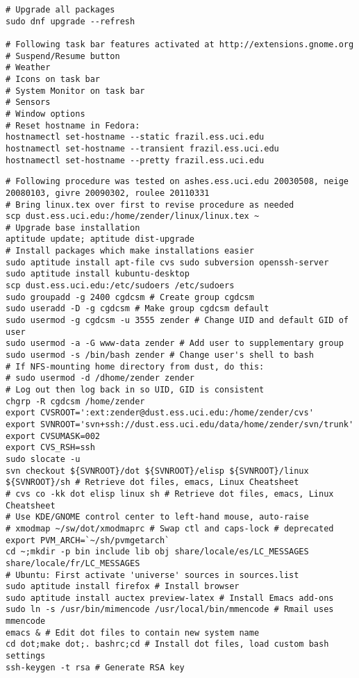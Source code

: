 \documentclass[12pt,twoside]{article}
\begin{document}
\begin{verbatim}
# Upgrade all packages
sudo dnf upgrade --refresh

# Following task bar features activated at http://extensions.gnome.org
# Suspend/Resume button
# Weather
# Icons on task bar
# System Monitor on task bar
# Sensors
# Window options
# Reset hostname in Fedora:
hostnamectl set-hostname --static frazil.ess.uci.edu
hostnamectl set-hostname --transient frazil.ess.uci.edu
hostnamectl set-hostname --pretty frazil.ess.uci.edu
\end{verbatim}
\begin{verbatim}
# Following procedure was tested on ashes.ess.uci.edu 20030508, neige 20080103, givre 20090302, roulee 20110331
# Bring linux.tex over first to revise procedure as needed
scp dust.ess.uci.edu:/home/zender/linux/linux.tex ~
# Upgrade base installation
aptitude update; aptitude dist-upgrade 
# Install packages which make installations easier
sudo aptitude install apt-file cvs sudo subversion openssh-server
sudo aptitude install kubuntu-desktop
scp dust.ess.uci.edu:/etc/sudoers /etc/sudoers
sudo groupadd -g 2400 cgdcsm # Create group cgdcsm
sudo useradd -D -g cgdcsm # Make group cgdcsm default
sudo usermod -g cgdcsm -u 3555 zender # Change UID and default GID of user
sudo usermod -a -G www-data zender # Add user to supplementary group
sudo usermod -s /bin/bash zender # Change user's shell to bash
# If NFS-mounting home directory from dust, do this:
# sudo usermod -d /dhome/zender zender 
# Log out then log back in so UID, GID is consistent
chgrp -R cgdcsm /home/zender
export CVSROOT=':ext:zender@dust.ess.uci.edu:/home/zender/cvs'
export SVNROOT='svn+ssh://dust.ess.uci.edu/data/home/zender/svn/trunk'
export CVSUMASK=002
export CVS_RSH=ssh
sudo slocate -u
svn checkout ${SVNROOT}/dot ${SVNROOT}/elisp ${SVNROOT}/linux ${SVNROOT}/sh # Retrieve dot files, emacs, Linux Cheatsheet
# cvs co -kk dot elisp linux sh # Retrieve dot files, emacs, Linux Cheatsheet
# Use KDE/GNOME control center to left-hand mouse, auto-raise 
# xmodmap ~/sw/dot/xmodmaprc # Swap ctl and caps-lock # deprecated
export PVM_ARCH=`~/sh/pvmgetarch`
cd ~;mkdir -p bin include lib obj share/locale/es/LC_MESSAGES share/locale/fr/LC_MESSAGES
# Ubuntu: First activate 'universe' sources in sources.list
sudo aptitude install firefox # Install browser
sudo aptitude install auctex preview-latex # Install Emacs add-ons
sudo ln -s /usr/bin/mimencode /usr/local/bin/mmencode # Rmail uses mmencode
emacs & # Edit dot files to contain new system name
cd dot;make dot;. bashrc;cd # Install dot files, load custom bash settings
ssh-keygen -t rsa # Generate RSA key

\end{verbatim}
\end{document}
